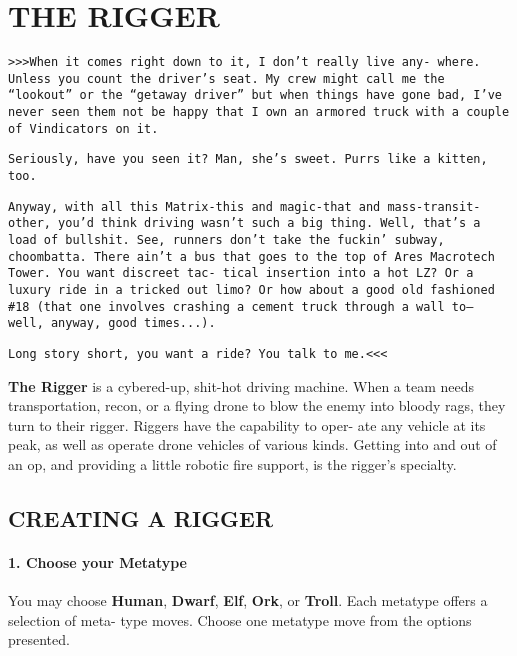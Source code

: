 
\section{THE RIGGER}
\begin{multicols}{3}
\setlength{\parskip}{.05cm}

\texttt{>>>When it comes right down to it, I don’t really live any-
where. Unless you count the driver’s seat. My crew might call
me the “lookout” or the “getaway driver” but when things
have gone bad, I’ve never seen them not be happy that I own
an armored truck with a couple of Vindicators on it.}

\texttt{Seriously, have you seen it? Man, she’s sweet. Purrs like a
kitten, too.}

\texttt{Anyway, with all this Matrix-this and magic-that and
mass-transit-other, you’d think driving wasn’t such a big
thing. Well, that’s a load of bullshit. See, runners don’t take
the fuckin’ subway, choombatta. There ain’t a bus that goes
to the top of Ares Macrotech Tower. You want discreet tac-
tical insertion into a hot LZ? Or a luxury ride in a tricked
out limo? Or how about a good old fashioned \#18 (that one
involves crashing a cement truck through a wall to-- well,
anyway, good times...).}

\texttt{Long story short, you want a ride? You talk to me.<<<}

\textbf{The Rigger} is a cybered-up, shit-hot driving machine.
When a team needs transportation, recon, or a flying
drone to blow the enemy into bloody rags, they turn
to their rigger. Riggers have the capability to oper-
ate any vehicle at its peak, as well as operate drone
vehicles of various kinds. Getting into and out of an
op, and providing a little robotic fire support, is the
rigger’s specialty.



\subsection{CREATING A RIGGER}

\paragraph{1.  Choose your Metatype}

You may choose \textbf{Human}, \textbf{Dwarf}, \textbf{Elf}, \textbf{Ork}, or
\textbf{Troll}. Each metatype offers a selection of meta-
type moves. Choose one metatype move from
the options presented.


\end{multicols}

